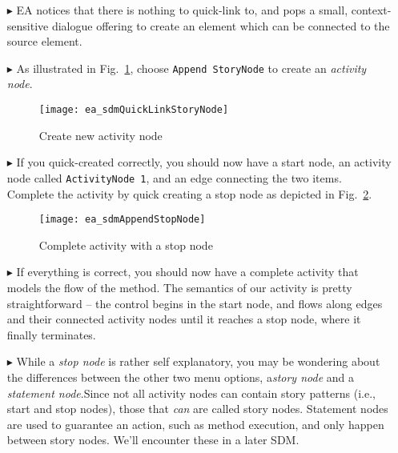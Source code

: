 \begin{itemize}
\item[$\blacktriangleright$] EA notices that there is nothing to quick-link to, and pops a small, context-sensitive dialogue offering to create an element which
can be connected to the source element.

\item[$\blacktriangleright$] As illustrated in Fig.~\ref{fig:sdm_new_activity_node}, choose \texttt{Append StoryNode} to create an \emph{activity
node}. 

\begin{figure}[htp]
\begin{center}
  \texttt{[image: ea\_sdmQuickLinkStoryNode]}
  \caption{Create new activity node}  
  \label{fig:sdm_new_activity_node}
\end{center}
\end{figure}

\item[$\blacktriangleright$] If you quick-created correctly, you should now have a start node, an activity node called \texttt{ActivityNode 1}, and an edge
connecting the two items. Complete the activity by quick creating a stop node as depicted in Fig.~\ref{fig:sdm_stop_node}.

\begin{figure}[htp]
\begin{center}
  \texttt{[image: ea\_sdmAppendStopNode]}
  \caption{Complete activity with a stop node}  
  \label{fig:sdm_stop_node}
\end{center}
\end{figure}

\vspace{0.5cm}

\item[$\blacktriangleright$] If everything is correct, you should now have a complete activity that models the flow of the method. 
The semantics of our activity is pretty straightforward -- the control begins in the start node, and flows along edges and their connected activity nodes until
it reaches a stop node, where it finally terminates. 

\vspace{0.5cm}

\item[$\blacktriangleright$] While a \emph{stop node} is rather self explanatory, you may be wondering about the differences between the other two menu options,
a\emph{story node} and a \emph{statement node}.Since not all activity nodes can contain story patterns (i.e., start
and stop nodes), those that \emph{can} are called story nodes. Statement nodes are used to guarantee an action, such as method execution, and only happen
between story nodes. We'll encounter these in a later SDM.


\end{itemize}
